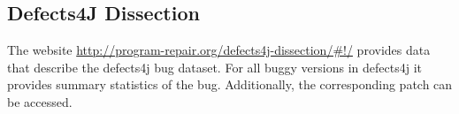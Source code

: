 \subsection{Defects4J Dissection}
\label{sec:defects4jDissection}

The website \url{http://program-repair.org/defects4j-dissection/#!/} provides
data that describe the defects4j bug dataset. For all buggy versions in
defects4j it provides summary statistics of the bug. Additionally, the
corresponding patch can be accessed.
